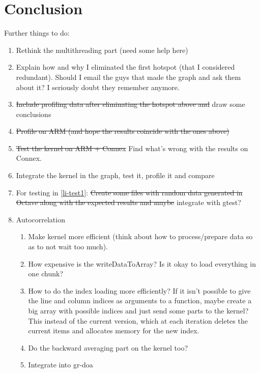 \section{Conclusion}
\label{sec:acc-conclusion}

Further things to do:
\begin{enumerate}
  \item Rethink the multithreading part (need some help here)

  \item Explain how and why I eliminated the first hotspot (that I considered
  redundant). Should I email the guys that made the graph and ask them about it?
  I seriously doubt they remember anymore.

  \item \sout{Include profiling data after eliminating the hotspot above and} draw some
  conclusions

  \item \sout{Profile on ARM (and hope the results coincide with the ones
  above)}

  \item \label{li-test1} \sout{Test the kernel on ARM + Connex} Find what's
  wrong with the results on Connex.

  \item Integrate the kernel in the graph, test it, profile it and compare

  \item For testing in \ref{li-test1}: \sout{Create some files with random data
  generated in Octave along with the expected results and maybe} integrate with
  gtest? 

  \item Autocorrelation
    \begin{enumerate}
      \item Make kernel more efficient (think about how to process/prepare data
      so as to not wait too much). 
      \item How expensive is the writeDataToArray? Is it okay to load everything
      in one chunk?
      \item How to do the index loading more efficiently? If it isn't possible
      to give the line and column indices as arguments to a function, maybe
      create a big array with possible indices and just send some parts to the
      kernel? This instead of the current version, which at each iteration
      deletes the current items and allocates memory for the new index.
      \item Do the backward averaging part on the kernel too?
      \item Integrate into gr-doa
    \end{enumerate}


\end{enumerate}
